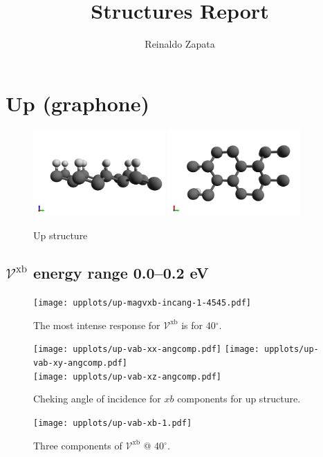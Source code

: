 \documentclass{article}
\title{Structures Report}
\author{Reinaldo Zapata}
\date{}
\let\Oldsection\section
\renewcommand{\section}{\FloatBarrier\Oldsection}
\let\Oldsubsection\subsection
\renewcommand{\subsection}{\FloatBarrier\Oldsubsection}
\begin{document}
\maketitle


\section{Up (graphone)} %
\label{sec:up}


\begin{figure}[h!]
    \centering
    \includegraphics[width=0.45\textwidth]{../up/up-figures/up-1}
    \includegraphics[width=0.45\textwidth]{../up/up-figures/up-2}
    \caption{Up structure}
    \label{fig:upstruc}
\end{figure}

\subsection{$\mathcal{V}^{\mathrm{xb}}$ energy range 0.0--0.2 eV }
\begin{figure}[h]
    \centering
    \texttt{[image: upplots/up-magvxb-incang-1-4545.pdf]}
    \caption{The most intense response for $\mathcal{V}^{\mathrm{xb}} $ is for 
    40$^{\circ}$.}
    \label{fig:up-magvxbincang1}
\end{figure}
\begin{figure}[h]
    \centering
    \texttt{[image: upplots/up-vab-xx-angcomp.pdf]}
    \texttt{[image: upplots/up-vab-xy-angcomp.pdf]}\\
    \texttt{[image: upplots/up-vab-xz-angcomp.pdf]}
    \caption{Cheking angle of incidence for $xb$ components for up structure.}
    \label{fig:up-xbangcomp}
\end{figure}
\begin{figure}[tb]
    \centering
    \texttt{[image: upplots/up-vab-xb-1.pdf]}
    \caption{Three components of $\mathcal{V}^{\mathrm{xb}} $ @ 40$^{\circ}$.}
    \label{fig:up-vxb1}
\end{figure}
\end{document}
